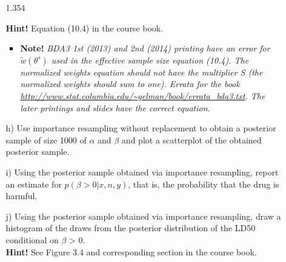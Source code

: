 \documentclass[11pt,a4paper,english]{article}
\begin{document}
\begin{enumerate}
\begin{itemize}
\begin{Schunk}
\begin{Soutput}
[1] 1.354
\end{Soutput}
\end{Schunk}
\textbf{Hint!} Equation (10.4) in the course book.
\begin{itemize}
\item \textbf{Note!} {\it BDA3 1st (2013) and 2nd (2014) printing have an error
   for $\tilde{w}(\theta^s)$ used in the effective sample size
   equation (10.4). The normalized weights equation should not have the
   multiplier S (the normalized weights should sum to one). Errata for
   the book
   \url{http://www.stat.columbia.edu/~gelman/book/errata_bda3.txt}.
   The later printings and slides have the correct equation.}
 \end{itemize}
\item[h)] Use importance resampling without replacement to obtain a posterior sample of size 1000 of $\alpha$ and $\beta$ and plot a scatterplot of the obtained posterior sample.
\item[i)] Using the posterior sample obtained via importance resampling, report an estimate for $p(\beta > 0|x, n, y)$, that is, the probability that the drug is harmful.
\item[j)] Using the posterior sample obtained via importance resampling, draw a histogram of the draws from the posterior distribution of the LD50 conditional on $\beta$ > 0.\\
\textbf{Hint!} See Figure 3.4 and corresponding section in the course book.
\end{itemize}



\end{enumerate}
\end{document}
